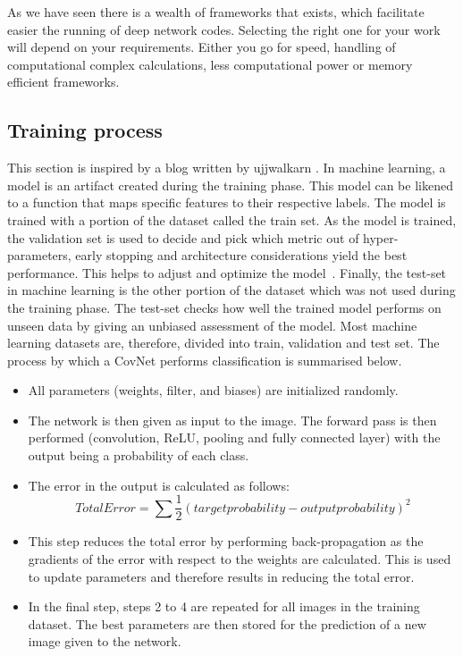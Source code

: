 \documentclass[12pt, a4paper,oneside]{report}
\begin{document}
As we have seen there is a wealth of frameworks that exists, which facilitate easier the running of deep network codes. Selecting the right one for your work will depend on your requirements. Either you go for speed, handling of computational complex calculations, less computational power or memory efficient frameworks.

\subsection{Training process}
This section is inspired by a blog written by ujjwalkarn \cite{cnnonline}. In machine learning, a model is an artifact created during the training phase. This model can be likened to a function that maps specific features to their respective labels. The model is trained with a portion of the dataset called the train set. As the model is trained, the validation set is used to decide and pick which metric out of hyper-parameters, early stopping and architecture considerations yield the best performance. This helps to adjust and optimize the model~\cite{validation}. Finally, the test-set in machine learning is the other portion of the dataset which was not used during the training phase. The test-set checks how well the trained model performs on unseen data by giving an unbiased assessment of the model. Most machine learning datasets are, therefore, divided into train, validation and test set. The process by which a CovNet performs classification is summarised below.

\begin{itemize}
	\item All parameters (weights, filter, and biases) are initialized randomly.
	\item The network is then given as input to the image. The forward pass is then performed (convolution, ReLU, pooling and fully connected layer) with the output being a probability of each class.
	\item The error in the output is calculated as follows:
	\[Total Error = \sum  \frac{1}{2} (target probability - output probability) ^2 \]
	\item This step reduces the total error by performing back-propagation as the gradients of the error with respect to the weights are calculated. This is used to update parameters and therefore results in reducing the total error.
	\item In the final step, steps 2 to 4 are repeated for all images in the training dataset. The best parameters are then stored for the prediction of a new image given to the network. 
	
\end{itemize} 
\end{document}
